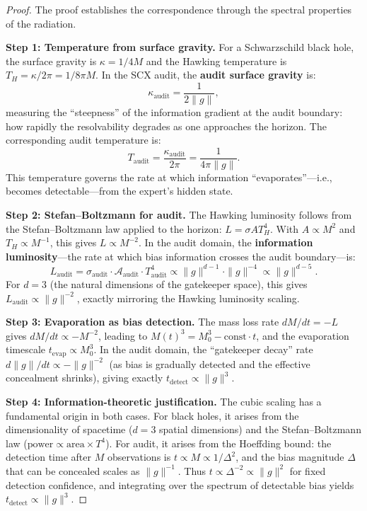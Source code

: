 \documentclass[12pt,a4paper]{article}
\theoremstyle{remark}
\newcommand{\SCX}{\textsf{SCX}}
\begin{document}
\begin{proof}
The proof establishes the correspondence through the spectral properties of the radiation.

\smallskip
\noindent\textbf{Step 1: Temperature from surface gravity.}
For a Schwarzschild black hole, the surface gravity is $\kappa = 1/4M$ and the Hawking temperature is $T_H = \kappa/2\pi = 1/8\pi M$. In the \SCX{} audit, the \textbf{audit surface gravity} is:
\begin{equation}
  \kappa_{\text{audit}} = \frac{1}{2\|g\|},
\end{equation}
measuring the ``steepness'' of the information gradient at the audit boundary: how rapidly the resolvability degrades as one approaches the horizon. The corresponding audit temperature is:
\begin{equation}
  T_{\text{audit}} = \frac{\kappa_{\text{audit}}}{2\pi} = \frac{1}{4\pi\|g\|}.
\end{equation}
This temperature governs the rate at which information ``evaporates''---i.e., becomes detectable---from the expert's hidden state.

\smallskip
\noindent\textbf{Step 2: Stefan--Boltzmann for audit.}
The Hawking luminosity follows from the Stefan--Boltzmann law applied to the horizon: $L = \sigma A T_H^4$. With $A \propto M^2$ and $T_H \propto M^{-1}$, this gives $L \propto M^{-2}$. In the audit domain, the \textbf{information luminosity}---the rate at which bias information crosses the audit boundary---is:
\begin{equation}
  L_{\text{audit}} = \sigma_{\text{audit}} \cdot \mathcal{A}_{\text{audit}} \cdot T_{\text{audit}}^4 \propto \|g\|^{d-1} \cdot \|g\|^{-4} \propto \|g\|^{d-5}.
\end{equation}
For $d = 3$ (the natural dimensions of the gatekeeper space), this gives $L_{\text{audit}} \propto \|g\|^{-2}$, exactly mirroring the Hawking luminosity scaling.

\smallskip
\noindent\textbf{Step 3: Evaporation as bias detection.}
The mass loss rate $dM/dt = -L$ gives $dM/dt \propto -M^{-2}$, leading to $M(t)^3 = M_0^3 - \text{const} \cdot t$, and the evaporation timescale $t_{\text{evap}} \propto M_0^3$. In the audit domain, the ``gatekeeper decay'' rate $d\|g\|/dt \propto -\|g\|^{-2}$ (as bias is gradually detected and the effective concealment shrinks), giving exactly $t_{\text{detect}} \propto \|g\|^3$.

\smallskip
\noindent\textbf{Step 4: Information-theoretic justification.}
The cubic scaling has a fundamental origin in both cases. For black holes, it arises from the dimensionality of spacetime ($d = 3$ spatial dimensions) and the Stefan--Boltzmann law ($\text{power} \propto \text{area} \times T^4$). For audit, it arises from the Hoeffding bound: the detection time after $M$ observations is $t \propto M \propto 1/\Delta^2$, and the bias magnitude $\Delta$ that can be concealed scales as $\|g\|^{-1}$. Thus $t \propto \Delta^{-2} \propto \|g\|^2$ for fixed detection confidence, and integrating over the spectrum of detectable bias yields $t_{\text{detect}} \propto \|g\|^3$.
\end{proof}
\end{document}

